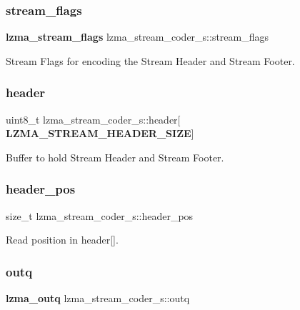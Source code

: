 \subsubsection{stream\+\_\+flags}
{\footnotesize\ttfamily \textbf{ lzma\+\_\+stream\+\_\+flags} lzma\+\_\+stream\+\_\+coder\+\_\+s\+::stream\+\_\+flags}



Stream Flags for encoding the Stream Header and Stream Footer. 

\mbox{\label{structlzma__stream__coder__s_a1689a58eecdd5c7f5b5e34e638a7a289}} 
\subsubsection{header}
{\footnotesize\ttfamily uint8\+\_\+t lzma\+\_\+stream\+\_\+coder\+\_\+s\+::header[\textbf{ L\+Z\+M\+A\+\_\+\+S\+T\+R\+E\+A\+M\+\_\+\+H\+E\+A\+D\+E\+R\+\_\+\+S\+I\+ZE}]}



Buffer to hold Stream Header and Stream Footer. 

\mbox{\label{structlzma__stream__coder__s_af4105efdd0b0722ad4428c82ce65912a}} 
\subsubsection{header\+\_\+pos}
{\footnotesize\ttfamily size\+\_\+t lzma\+\_\+stream\+\_\+coder\+\_\+s\+::header\+\_\+pos}



Read position in header[]. 

\mbox{\label{structlzma__stream__coder__s_a7504888af74013f9cf47191989061418}} 
\subsubsection{outq}
{\footnotesize\ttfamily \textbf{ lzma\+\_\+outq} lzma\+\_\+stream\+\_\+coder\+\_\+s\+::outq}



